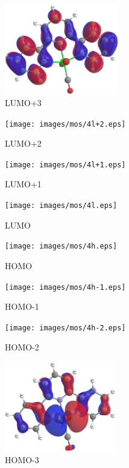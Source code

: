 \begin{figure}[!ht]
 \centering
 \begin{subfigure}[b]{0.31\textwidth}
  \includegraphics[clip=true, width=\textwidth, height=39mm, keepaspectratio]{images/mos/4l+3.eps}
  \caption{LUMO+3}
 \end{subfigure}
 \begin{subfigure}[b]{0.31\textwidth}
  \texttt{[image: images/mos/4l+2.eps]}
  \caption{LUMO+2}
 \end{subfigure}
  \begin{subfigure}[b]{0.31\textwidth}
  \texttt{[image: images/mos/4l+1.eps]}
  \caption{LUMO+1}
 \end{subfigure}
  \begin{subfigure}[b]{0.31\textwidth}
  \texttt{[image: images/mos/4l.eps]}
  \caption{LUMO}
 \end{subfigure}
 \begin{subfigure}[b]{0.31\textwidth}
  \texttt{[image: images/mos/4h.eps]}
  \caption{HOMO}
 \end{subfigure}
 \begin{subfigure}[b]{0.31\textwidth}
  \texttt{[image: images/mos/4h-1.eps]}
  \caption{HOMO-1}
 \end{subfigure}
 \begin{subfigure}[b]{0.31\textwidth}
  \texttt{[image: images/mos/4h-2.eps]}
  \caption{HOMO-2}
 \end{subfigure}
 \begin{subfigure}[b]{0.31\textwidth}
  \includegraphics[clip=true, width=\textwidth, height=39mm, keepaspectratio]{images/mos/4h-3.eps}
  \caption{HOMO-3}
 \end{subfigure}
 \begin{subfigure}[b]{0.31\textwidth}

\end{subfigure}
\end{figure}
